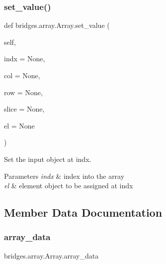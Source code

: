 \subsubsection{\texorpdfstring{set\+\_\+value()}{set\_value()}}
{\footnotesize\ttfamily def bridges.\+array.\+Array.\+set\+\_\+value (\begin{DoxyParamCaption}\item[{}]{self,  }\item[{}]{indx = {\ttfamily None},  }\item[{}]{col = {\ttfamily None},  }\item[{}]{row = {\ttfamily None},  }\item[{}]{slice = {\ttfamily None},  }\item[{}]{el = {\ttfamily None} }\end{DoxyParamCaption})}



Set the input object at \textquotesingle{}indx\textquotesingle{}. 


\begin{DoxyParams}{Parameters}
{\em indx} & index into the array \\
\hline
{\em el} & element object to be assigned at \textquotesingle{}indx\textquotesingle{} \\
\hline
\end{DoxyParams}


\subsection{Member Data Documentation}
\mbox{\label{classbridges_1_1array_1_1_array_a980c0fdfeddadd4c23f06b57015c3c34}} 
\subsubsection{\texorpdfstring{array\+\_\+data}{array\_data}}
{\footnotesize\ttfamily bridges.\+array.\+Array.\+array\+\_\+data}

\mbox{\label{classbridges_1_1array_1_1_array_a552363bc0dc8c8dbb2a9204cc98a767e}} 
